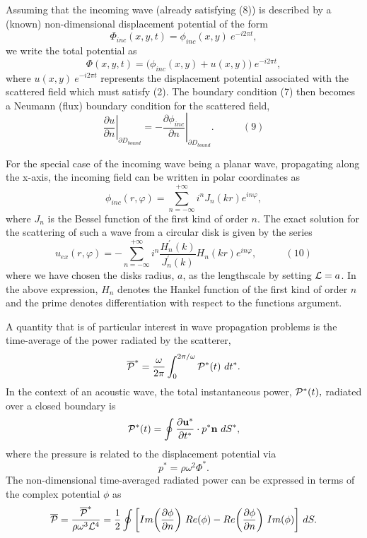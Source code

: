 Assuming that the incoming wave (already satisfying (8)) is described by a (known) non-\/dimensional displacement potential of the form \[ \Phi_{inc}(x,y,t) = \phi_{inc}(x,y) \ e^{-i 2\pi t}, \] we write the total potential as \[ \Phi(x,y,t) = \bigg( \phi_{inc}(x,y) + u(x,y) \bigg) \ e^{-i 2\pi t}, \] where $ u(x,y) \ e^{-i 2\pi t} $ represents the displacement potential associated with the scattered field which must satisfy (2). The boundary condition (7) then becomes a Neumann (flux) boundary condition for the scattered field, \[ \left. \frac{\partial u}{\partial n}\right|_{\partial D_{bound}} = - \left. \frac{\partial \phi_{inc}}{\partial n}\right|_{\partial D_{bound}}. \ \ \ \ \ \ \ \ \ \ \ \ \ (9) \]

For the special case of the incoming wave being a planar wave, propagating along the x-\/axis, the incoming field can be written in polar coordinates as \[ \phi_{inc}(r, \varphi) = \sum_{n=-\infty}^{+\infty} i^n J_n(kr) e^{in\varphi}, \] where $ J_n $ is the Bessel function of the first kind of order $ n $. The exact solution for the scattering of such a wave from a circular disk is given by the series \[ u_{ex}(r,\varphi) = -\sum_{n=-\infty}^{+\infty} i^n \frac {H^{'}_{n}(k)}{J^{'}_{n}(k)} H_n(kr) e^{in\varphi}, \ \ \ \ \ \ \ \ \ \ \ \ \ (10) \] where we have chosen the disk\textquotesingle{}s radius, $ a $, as the lengthscale by setting $ {\cal L} = a$. In the above expression, $ H_n $ denotes the Hankel function of the first kind of order $ n $ and the prime denotes differentiation with respect to the function\textquotesingle{}s argument.

A quantity that is of particular interest in wave propagation problems is the time-\/average of the power radiated by the scatterer, \[ \overline{\cal P}^* = \frac{\omega}{2\pi} \int_{0}^{2\pi/\omega} {\cal P}^*(t) \ dt^*. \] In the context of an acoustic wave, the total instantaneous power, $ {\cal P}^*(t), $ radiated over a closed boundary is \[ {\cal P}^*(t) = \oint \frac{\partial {\bf u^*} }{\partial t^*} \cdot p^* {\bf n} \ dS^*, \] where the pressure is related to the displacement potential via \[ p^* = \rho \omega^2 \Phi^*. \] The non-\/dimensional time-\/averaged radiated power can be expressed in terms of the complex potential $ \phi $ as \[ \overline{\cal P} = \frac{\overline{\cal P}^*}{\rho \omega^3 {\cal L}^4} = \frac{1}{2} \oint\bigg[Im\bigg(\frac{\partial \phi}{\partial n}\bigg) \ Re(\phi) - Re\bigg(\frac{\partial \phi}{\partial n}\bigg) \ Im(\phi) \bigg] \ dS. \] 

 

